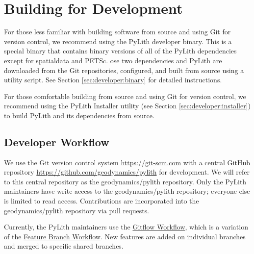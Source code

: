 \section{Building for Development}
\label{sec:developer:build}

For those less familiar with building software from source and using
Git for version control, we recommend using the PyLith developer
binary. This is a special binary that contains binary versions of all of the PyLith
dependencies except for spatialdata and PETSc. ose two dependencies
and PyLith are downloaded from the Git repositories, configured, and
built from source using a utility script. See Section
\vref{sec:developer:binary} for detailed instructions.

For those comfortable building from source and using Git for version
control, we recommend using the PyLith Installer utility (see Section
\vref{sec:developer:installer}) to build PyLith and its dependencies from
source.

\subsection{Developer Workflow}

We use the Git version control system \url{https://git-scm.com} with a
central GitHub repository \url{https://github.com/geodynamics/pylith}
for development. We will refer to this central repository as the
geodynamics/pylith repository. Only the PyLith maintainers have write
access to the geodynamics/pylith repository; everyone else is limited
to read access. Contributions are incorporated into the
geodynamics/pylith repository via pull requests.

Currently, the PyLith maintainers use the
\href{https://www.atlassian.com/git/tutorials/comparing-workflows/gitflow-workflow}{Gitflow
  Workflow}, which is a variation of the
\href{https://www.atlassian.com/git/tutorials/comparing-workflows/feature-branch-workflow}{Feature
  Branch Workflow}. New features are added on individual branches and
merged to specific shared branches.

